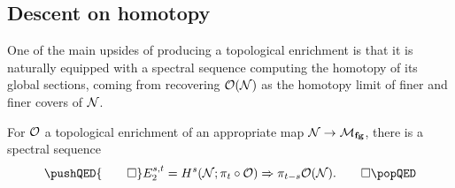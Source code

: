 \subsection*{Descent on homotopy}

One of the main upsides of producing a topological enrichment is that it is naturally equipped with a spectral sequence computing the homotopy of its global sections, coming from recovering $\mathcal{O}(\mathcal{N})$ as the homotopy limit of finer and finer covers of $\mathcal{N}$.

\begin{lemma}
For $\mathcal{O}$ a topological enrichment of an appropriate map $\mathcal{N} \to \mathcal{M}_{\mathbf{fg}}$, there is a spectral sequence \[\pushQED{\qed} E_2^{s, t} = H^s(\stack{N}; \pi_t \circ \sheaf O) \Rightarrow \pi_{t-s} \sheaf{O}(\stack{N}). \qedhere \popQED\]
\end{lemma}

